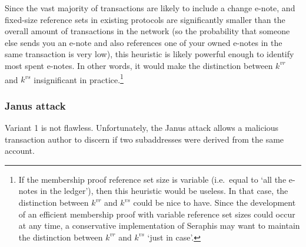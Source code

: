 Since the vast majority of transactions are likely to include a change e-note, and fixed-size reference sets in existing protocols are significantly smaller than the overall amount of transactions in the network (so the probability that someone else sends you an e-note and also references one of your owned e-notes in the same transaction is very low), this heuristic is likely powerful enough to identify most spent e-notes. In other words, it would make the distinction between $k^{vr}$ and $k^{vs}$ insignificant in practice.\footnote{If the membership proof reference set size is variable (i.e.\ equal to `all the e-notes in the ledger'), then this heuristic would be useless. In that case, the distinction between $k^{vr}$ and $k^{vs}$ could be nice to have. Since the development of an efficient membership proof with variable reference set sizes could occur at any time, a conservative implementation of Seraphis may want to maintain the distinction between $k^{vr}$ and $k^{vs}$ `just in case'.}

\subsubsection{Janus attack}

Variant 1 is not flawless. Unfortunately, the Janus attack \cite{janus-attack} allows a malicious transaction author to discern if two subaddresses were derived from the same account.

